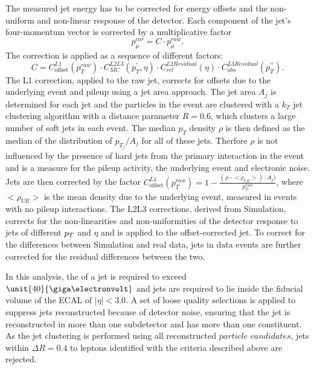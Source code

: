 The measured jet energy has to be corrected for energy offsets and the non-uniform and non-linear response of the detector. Each component of the jet's four-momentum vector is corrected by a multiplicative factor~\cite{1748-0221-6-11-P11002}
\begin{equation}
p_{\mu}^{cor} = C \cdot p_{\mu}^{raw}.
\end{equation} 
The correction is applied as a sequence of different factors: 
\begin{equation}
C = C^{L1}_{\text{offset}}(p_T^{raw})\cdot C^{L2L3}_{MC}(p_T^{\prime},\eta)\cdot C^{L2Residual}_{rel}(\eta) \cdot C^{L3Residual}_{abs}(p_T^{\prime\prime}).
\end{equation}
The L1 correction, applied to the raw jet, corrects for offsets due to the underlying event and pileup using a jet area approach. The jet area $A_j$ is determined for each jet and the particles in the event are clustered with a $k_T$ jet clustering algorithm with a distance parameter $R=0.6$, which clusters a large number of soft jets in each event. The median $p_T$ density $\rho$ is then defined as the median of the distribution of $p_{T_j}/A_j$ for all of these jets. Therfore $\rho$ is not influenced by the presence of hard jets from the primary interaction in the event and is a measure for the pileup activity, the underlying event and electronic noise. Jets are then corrected by the factor $C^{L1}_{\text{offset}}(p_T^{raw}) = 1-\frac{(\rho-<\rho_{UE}>)\cdot A_j)}{p_T^{raw}}$, where $<\rho_{UE}>$ is the mean \pt density due to the underlying event, measured in events with no pileup interactions. The L2L3 corrections, derived from Simulation, corrects for the non-linearities and non-uniformities of the detector response to jets of different $p_{T}$ and $\eta$ and is applied to the offset-corrected jet. To correct for the differences between Simulation and real data, jets in data events are further corrected for the residual differences between the two.  

In this analysis, the \pt of a jet is required to exceed $\unit{40}{\giga\electronvolt}$ and jets are required to lie inside the fiducial volume of the ECAL of $|\eta| < 3.0$. A set of loose quality selections is applied to suppress jets reconstructed because of detector noise, ensuring that the jet is reconstructed in more than one subdetector and has more than one constituent. As the jet clustering is performed using all reconstructed $\textit{particle candidates}$, jets within $\Delta R = 0.4$ to leptons identified with the criteria described above are rejected. 

